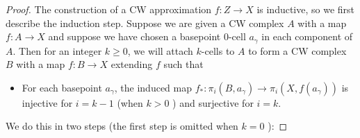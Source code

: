 \documentclass[reqno]{amsart}
\theoremstyle{definition}
\theoremstyle{remark}
\begin{document}
\begin{proof}
    The construction of a CW approximation
    $f \colon Z \to X$ is inductive, so we first
    describe the induction step. 
    Suppose we are given a CW complex $A$ with a map
    $f \colon A \to X$ and suppose
    we have chosen a basepoint $0$-cell $a_{\gamma}$ in
    each component of $A$.
    Then for an integer $k\ge 0$, we will attach
    $k$-cells to $A$ to form a CW complex
    $B$ with a map $f \colon B \to X$ extending $f$ such that
    \begin{itemize}
        \item For each basepoint $a_{\gamma}$, the
            induced map $f_* \colon
            \pi_i \left( B, a_{\gamma} \right) 
            \to \pi_i \left( X, f\left( a_{\gamma} \right) 
            \right) $ is injective for
            $i = k-1$ (when $k>0$ ) and surjective
            for $i = k$.
    \end{itemize}

    We do this in two steps (the first step is omitted
    when $k= 0$ ):


\end{proof}
\end{document}
